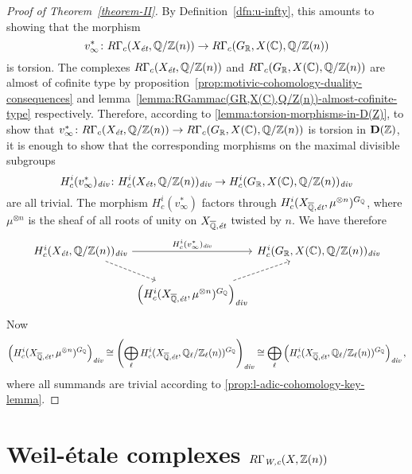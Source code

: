 \documentclass{article}
\numberwithin{equation}{section}
\begin{document}
\begin{proof}[Proof of Theorem~\ref{theorem-II}]
  By Definition~\ref{dfn:u-infty}, this amounts to showing that the morphism
  $$v_\infty^*\colon R\Gamma_c (X_\et, \QQ/\ZZ (n)) \to R\Gamma_c (G_\RR, X (\CC), \QQ/\ZZ (n))$$
  is torsion. The complexes $R\Gamma_c (X_\et, \QQ/\ZZ (n))$ and
  $R\Gamma_c (G_\RR, X (\CC), \QQ/\ZZ (n))$ are almost of cofinite type by
  proposition~\ref{prop:motivic-cohomology-duality-consequences} and
  lemma~\ref{lemma:RGammac(GR,X(C),Q/Z(n))-almost-cofinite-type} respectively.
  Therefore, according to \ref{lemma:torsion-morphisms-in-D(Z)}, to show that
  $v^*_\infty\colon R\Gamma_c (X_\et, \QQ/\ZZ (n)) \to R\Gamma_c (G_\RR, X
  (\CC), \QQ/\ZZ (n))$ is torsion in $\mathbf{D} (\ZZ)$, it is enough to show
  that the corresponding morphisms on the maximal divisible subgroups
  \[ H^i_c (v^*_\infty)_\div\colon H^i_c (X_\et, \QQ/\ZZ (n))_\div \to
     H^i_c (G_\RR, X (\CC), \QQ/\ZZ (n))_\div \]
  are all trivial. The morphism $H^i_c (v^*_\infty)$ factors through
  $H^i_c (X_{\overline{\QQ}, \text{\it ét}}, \mu^{\otimes n})^{G_\QQ}$, where
  $\mu^{\otimes n}$ is the sheaf of all roots of unity on
  $X_{\overline{\QQ}, \text{\it ét}}$ twisted by $n$.
  We have therefore
  \[ \begin{tikzcd}[column sep=0pt]
    H^i_c (X_\et, \QQ/\ZZ (n))_\div\ar{rr}{H^i_c (v^*_\infty)_\div}\ar[dashed]{dr} && H^i_c (G_\RR, X (\CC), \QQ/\ZZ (n))_\div\\
    & \left(H^i_c (X_{\overline{\QQ}, \text{\it ét}}, \mu^{\otimes n})^{G_\QQ}\right)_\div\ar[dashed]{ur}
  \end{tikzcd} \]
  Now
  \[ \left(H^i_c (X_{\overline{\QQ}, \text{\it ét}}, \mu^{\otimes n})^{G_\QQ}\right)_\div \cong
  \left(\bigoplus_\ell H^i_c (X_{\overline{\QQ}, \text{\it ét}}, \QQ_\ell/\ZZ_\ell (n))^{G_\QQ}\right)_\div \cong
  \bigoplus_\ell \left(H^i_c (X_{\overline{\QQ}, \text{\it ét}}, \QQ_\ell/\ZZ_\ell (n))^{G_\QQ}\right)_\div, \]
  where all summands are trivial according to
  \ref{prop:l-adic-cohomology-key-lemma}.
\end{proof}


\section{Weil-étale complexes \texorpdfstring{$R\Gamma_\Wc (X, \ZZ(n))$}{RΓ\_W,c (X, ℤ(n))}}
\label{sec:RGamma-Wc}
\end{document}

